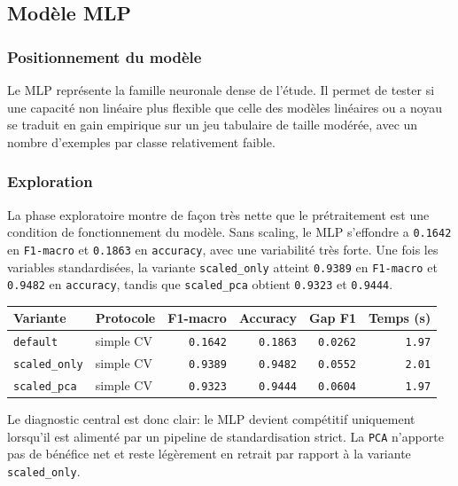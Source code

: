 \subsection{Modèle MLP}

\subsubsection{Positionnement du modèle}
Le MLP représente la famille neuronale dense de l'étude. Il permet de tester si une capacité non linéaire plus flexible que celle des modèles linéaires ou a noyau se traduit en gain empirique sur un jeu tabulaire de taille modérée, avec un nombre d'exemples par classe relativement faible.

\subsubsection{Exploration}
La phase exploratoire montre de façon très nette que le prétraitement est une condition de fonctionnement du modèle. Sans scaling, le MLP s'effondre a \texttt{0.1642} en \texttt{F1-macro} et \texttt{0.1863} en \texttt{accuracy}, avec une variabilité très forte. Une fois les variables standardisées, la variante \texttt{scaled\_only} atteint \texttt{0.9389} en \texttt{F1-macro} et \texttt{0.9482} en \texttt{accuracy}, tandis que \texttt{scaled\_pca} obtient \texttt{0.9323} et \texttt{0.9444}.

\begin{table}[H]
\centering
\begin{tabular}{|l|l|r|r|r|r|}
\hline
\textbf{Variante} & \textbf{Protocole} & \textbf{F1-macro} & \textbf{Accuracy} & \textbf{Gap F1} & \textbf{Temps (s)} \\
\hline
\texttt{default} & simple CV & \texttt{0.1642} & \texttt{0.1863} & \texttt{0.0262} & \texttt{1.97} \\
\texttt{scaled\_only} & simple CV & \texttt{0.9389} & \texttt{0.9482} & \texttt{0.0552} & \texttt{2.01} \\
\texttt{scaled\_pca} & simple CV & \texttt{0.9323} & \texttt{0.9444} & \texttt{0.0604} & \texttt{1.97} \\
\hline
\end{tabular}
\end{table}

Le diagnostic central est donc clair: le MLP devient compétitif uniquement lorsqu'il est alimenté par un pipeline de standardisation strict. La \texttt{PCA} n'apporte pas de bénéfice net et reste légèrement en retrait par rapport à la variante \texttt{scaled\_only}.

